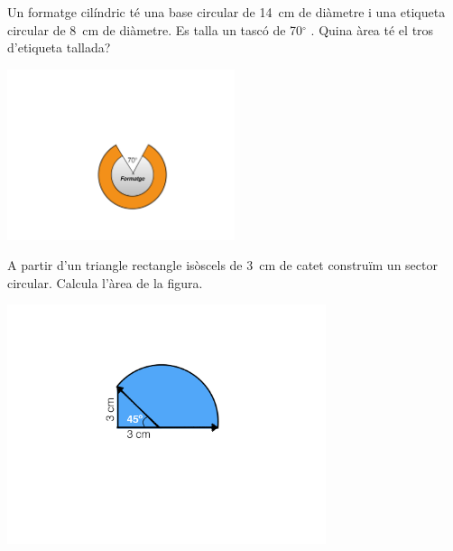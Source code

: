 \begin{mylist}
\vspace*{-1.5cm}
\exer \begin{minipage}[t]{0.7\textwidth}
	Un formatge cilíndric té una base circular de 14~cm de diàmetre i una etiqueta circular de 8~cm de diàmetre. Es talla un tascó de 70${}^\circ$ . Quina àrea té el tros d'etiqueta tallada? 
	
\end{minipage}
\begin{minipage}{0.3\textwidth}
	\centering
	\vspace{1.5cm}
	\includegraphics[width=0.5\textwidth]{img-09/formatge}
\end{minipage}
 
  
\pagebreak
\mbox{}
 
\vspace*{-1.5cm}
\exer[1] \begin{minipage}[t]{0.62\textwidth}
	A partir d'un triangle rectangle isòscels de 3~cm de catet construïm un sector circular. Calcula l'àrea de la figura.
\end{minipage}
\begin{minipage}{0.3\textwidth}
	\centering
	\vspace{1.5cm}
	\includegraphics[width=0.7\textwidth]{img-09/fig14}
\end{minipage}
 

\end{mylist}
